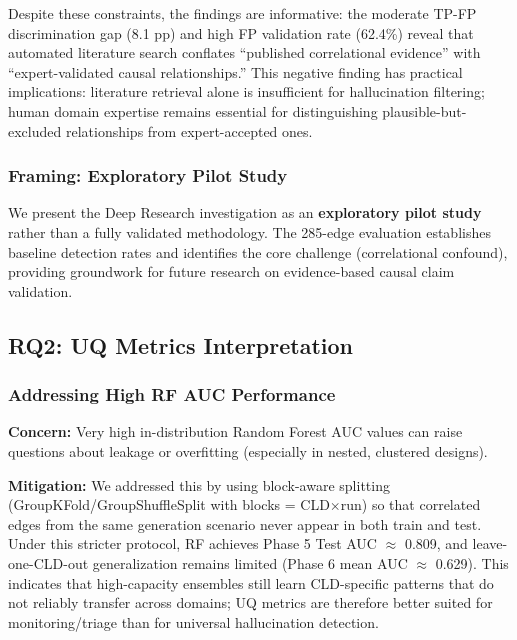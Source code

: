 Despite these constraints, the findings are informative: the moderate TP-FP discrimination gap (8.1 pp) and high FP validation rate (62.4\%) reveal that automated literature search conflates ``published correlational evidence'' with ``expert-validated causal relationships.'' This negative finding has practical implications: literature retrieval alone is insufficient for hallucination filtering; human domain expertise remains essential for distinguishing plausible-but-excluded relationships from expert-accepted ones.

\subsubsection{Framing: Exploratory Pilot Study}

We present the Deep Research investigation as an \textbf{exploratory pilot study} rather than a fully validated methodology. The 285-edge evaluation establishes baseline detection rates and identifies the core challenge (correlational confound), providing groundwork for future research on evidence-based causal claim validation.


\subsection{RQ2: UQ Metrics Interpretation}

\subsubsection{Addressing High RF AUC Performance}
\textbf{Concern:} Very high in-distribution Random Forest AUC values can raise questions about leakage or overfitting (especially in nested, clustered designs).

\textbf{Mitigation:} We addressed this by using block-aware splitting (GroupKFold/GroupShuffleSplit with blocks = CLD$\times$run) so that correlated edges from the same generation scenario never appear in both train and test. Under this stricter protocol, RF achieves Phase 5 Test AUC $\approx$ 0.809, and leave-one-CLD-out generalization remains limited (Phase 6 mean AUC $\approx$ 0.629). This indicates that high-capacity ensembles still learn CLD-specific patterns that do not reliably transfer across domains; UQ metrics are therefore better suited for monitoring/triage than for universal hallucination detection.

